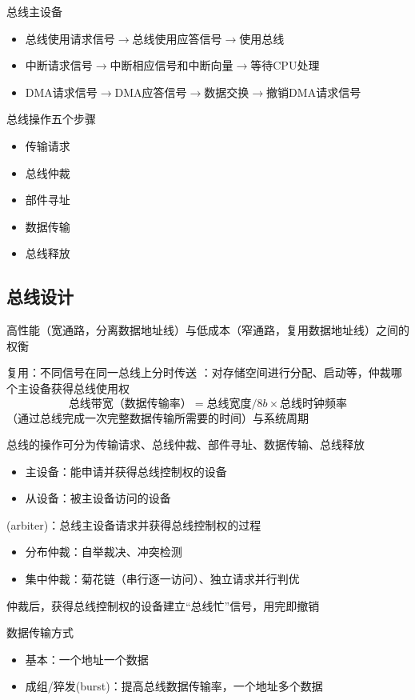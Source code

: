 总线主设备
\begin{itemize}
	\item 总线使用请求信号$\to$总线使用应答信号$\to$使用总线
	\item 中断请求信号$\to$中断相应信号和中断向量$\to$等待CPU处理
	\item DMA请求信号$\to$DMA应答信号$\to$数据交换$\to$撤销DMA请求信号
\end{itemize}
总线操作五个步骤
\begin{itemize}
	\item 传输请求
	\item 总线仲裁
	\item 部件寻址
	\item 数据传输
	\item 总线释放
\end{itemize}

\subsection{总线设计}
高性能（宽通路，分离数据地址线）与低成本（窄通路，复用数据地址线）之间的权衡
\par 复用：不同信号在同一总线上分时传送
：对存储空间进行分配、启动等，仲裁哪个主设备获得总线使用权
\[\text{总线带宽（数据传输率）}=\text{总线宽度}/8b\times\text{总线时钟频率}\]
（通过总线完成一次完整数据传输所需要的时间）与系统周期
\par 总线的操作可分为传输请求、总线仲裁、部件寻址、数据传输、总线释放
\begin{itemize}
	\item 主设备：能申请并获得总线控制权的设备
	\item 从设备：被主设备访问的设备
\end{itemize}
(arbiter)：总线主设备请求并获得总线控制权的过程
\begin{itemize}
	\item 分布仲裁：自举裁决、冲突检测
	\item 集中仲裁：菊花链（串行逐一访问）、独立请求并行判优
\end{itemize}
仲裁后，获得总线控制权的设备建立“总线忙”信号，用完即撤销
\par 数据传输方式
\begin{itemize}
	\item 基本：一个地址一个数据
	\item 成组/猝发(burst)：提高总线数据传输率，一个地址多个数据
\end{itemize}